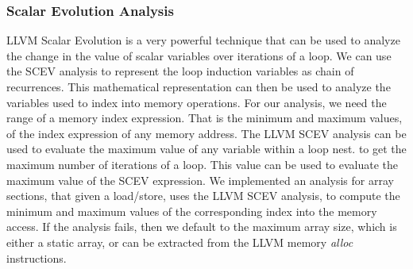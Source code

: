 \subsubsection{Scalar Evolution Analysis}
LLVM Scalar Evolution is a very powerful technique
that can be used to analyze the change in 
the value of scalar variables over iterations of a loop. 
We can use the SCEV analysis to represent the loop induction variables 
as chain of recurrences. This mathematical representation 
can then be used to analyze the variables used to index into memory 
operations. 
For our analysis, we need the range of a memory index expression. 
That is the minimum and maximum values, 
of the index expression of any memory address. 
The LLVM SCEV 
analysis can be used to evaluate the maximum value of any variable within 
a loop nest.
to get the maximum number of iterations
of a loop. 
This value can be used to evaluate the maximum value of the SCEV
expression.
We implemented an analysis for array sections, 
that given a load/store, uses the LLVM SCEV analysis, to compute the minimum and maximum values of 
the corresponding index into the memory access. 
If the analysis fails, then we default to the maximum array size, 
which is either a static array, or can be extracted from the LLVM
memory  \textit{alloc} instructions.
